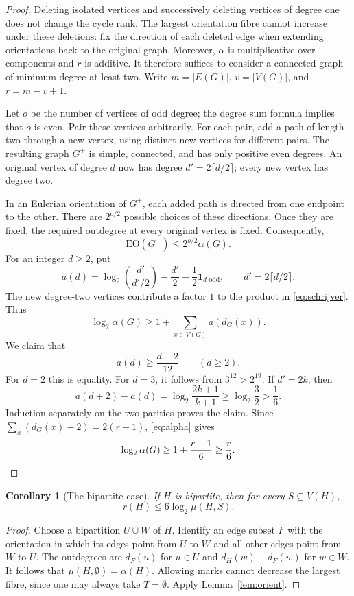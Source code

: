 \documentclass[11pt]{article}
\numberwithin{equation}{section}
\newtheorem{corollary}[theorem]{Corollary}
\theoremstyle{remark}
\begin{document}
\begin{proof}
Deleting isolated vertices and successively deleting vertices of degree one does not change the cycle rank. The largest orientation fibre cannot increase under these deletions: fix the direction of each deleted edge when extending orientations back to the original graph. Moreover, $\alpha$ is multiplicative over components and $r$ is additive. It therefore suffices to consider a connected graph of minimum degree at least two. Write $m=|E(G)|$, $v=|V(G)|$, and $r=m-v+1$.

Let $o$ be the number of vertices of odd degree; the degree sum formula implies that $o$ is even. Pair these vertices arbitrarily. For each pair, add a path of length two through a new vertex, using distinct new vertices for different pairs. The resulting graph $G^+$ is simple, connected, and has only positive even degrees. An original vertex of degree $d$ now has degree $d'=2\lceil d/2\rceil$; every new vertex has degree two.

In an Eulerian orientation of $G^+$, each added path is directed from one endpoint to the other. There are $2^{o/2}$ possible choices of these directions. Once they are fixed, the required outdegree at every original vertex is fixed. Consequently,
\[
\mathrm{EO}(G^+)\le2^{o/2}\alpha(G).
\]
For an integer $d\ge2$, put
\[
a(d)=\log_2\binom{d'}{d'/2}-\frac{d'}2-\frac12\mathbf 1_{d\text{ odd}},\qquad d'=2\lceil d/2\rceil.
\]
The new degree-two vertices contribute a factor $1$ to the product in \eqref{eq:schrijver}. Thus
\begin{equation}\label{eq:alpha}
\log_2\alpha(G)\ge1+\sum_{x\in V(G)}a(d_G(x)).
\end{equation}
We claim that
\[
a(d)\ge\frac{d-2}{12}\qquad(d\ge2).
\]
For $d=2$ this is equality. For $d=3$, it follows from $3^{12}>2^{19}$. If $d'=2k$, then
\[
a(d+2)-a(d)=\log_2\frac{2k+1}{k+1}\ge\log_2\frac32>\frac16.
\]
Induction separately on the two parities proves the claim. Since $\sum_x(d_G(x)-2)=2(r-1)$, \eqref{eq:alpha} gives
\[
\log_2\alpha(G)\ge1+\frac{r-1}6\ge\frac r6.\qedhere
\]
\end{proof}

\begin{corollary}[The bipartite case]\label{cor:bip}
If $H$ is bipartite, then for every $S\subseteq V(H)$,
\[
r(H)\le6\log_2\mu(H,S).
\]
\end{corollary}

\begin{proof}
Choose a bipartition $U\cup W$ of $H$. Identify an edge subset $F$ with the orientation in which its edges point from $U$ to $W$ and all other edges point from $W$ to $U$. The outdegrees are $d_F(u)$ for $u\in U$ and $d_H(w)-d_F(w)$ for $w\in W$. It follows that $\mu(H,\emptyset)=\alpha(H)$. Allowing marks cannot decrease the largest fibre, since one may always take $T=\emptyset$. Apply Lemma~\ref{lem:orient}.
\end{proof}
\end{document}
